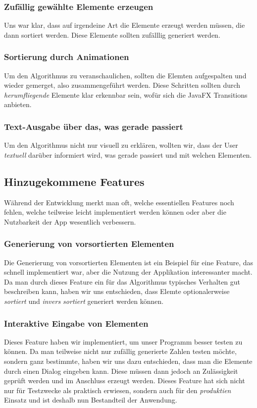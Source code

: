 \subsubsection{Zufällig gewählte Elemente erzeugen}
Uns war klar, dass auf irgendeine Art die Elemente erzeugt werden müssen, die dann sortiert werden. Diese Elemente sollten zufälllig generiert werden.

\subsubsection{Sortierung durch Animationen}
Um den Algorithmus zu veranschaulichen, sollten die Elemten aufgespalten und wieder gemerget, also zusammengeführt werden. Diese Schritten sollten durch \textit{herumfliegende} Elemente klar erkennbar sein, wofür sich die JavaFX Transitions anbieten.

\subsubsection{Text-Ausgabe über das, was gerade passiert}
Um den Algorithmus nicht nur visuell zu erklären, wollten wir, dass der User \textit{textuell} darüber informiert wird, was gerade passiert und mit welchen Elementen.

\subsection{Hinzugekommene Features}
Während der Entwicklung merkt man oft, welche essentiellen Features noch fehlen, welche teilweise leicht implementiert werden können oder aber die Nutzbarkeit der App wesentlich verbessern.
\subsubsection{Generierung von vorsortierten Elementen}
Die Generierung von vorsortierten Elementen ist ein Beispiel für eine Feature, das schnell implementiert war, aber die Nutzung der Applikation interessanter macht. Da man durch dieses Feature ein für das Algorithmus typisches Verhalten gut beschreiben kann, haben wir uns entschieden, dass Elemte optionalerweise \textit{sortiert} und \textit{invers sortiert} generiert werden können.

\subsubsection{Interaktive Eingabe von Elementen}
Dieses Feature haben wir implementiert, um unser Programm besser testen zu können. Da man teilweise nicht nur zufällig generierte Zahlen testen möchte, sondern ganz bestimmte, haben wir uns dazu entschieden, dass man die Elemente durch einen Dialog eingeben kann. Diese müssen dann jedoch an Zulässigkeit geprüft werden und im Anschluss erzeugt werden. Dieses Feature hat sich nicht nur für Testzwecke als praktisch erwiesen, sondern auch für den \textit{produktien} Einsatz und ist deshalb nun Bestandteil der Anwendung.

